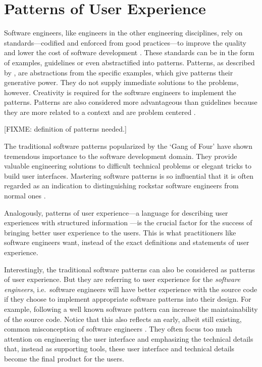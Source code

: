 \documentclass{acm_proc_article-sp}
\begin{document}
\citet{unix:raymond}


\section{Patterns of User Experience}
\label{sec:pux}
Software engineers, like engineers in the other engineering
disciplines, rely on standards---codified and enforced from good
practices---to improve the quality and lower the cost of software
development \citep{practice:ipenz}. These standards can be in the form
of examples, guidelines or even abstractified into patterns. Patterns,
as described by \citet{patterns:griffiths}, are abstractions from the
specific examples, which give patterns their generative power. They do
not supply immediate solutions to the problems, however. Creativity is
required for the software engineers to implement the
patterns. Patterns are also considered more advantageous than
guidelines because they are more related to a context and are problem
centered \citep{patterns:welie}.

[FIXME: definition of patterns needed.]

The traditional software patterns popularized by the `Gang of Four'
\citep{patterns:gamma} have shown tremendous importance to the
software development domain. They provide valuable engineering
solutions to difficult technical problems or elegant tricks to build
user interfaces. Mastering software patterns is so influential that it
is often regarded as an indication to distinguishing rockstar software
engineers from normal ones \citep{rockstar:iskold}.

Analogously, patterns of user experience---a language for describing
user experiences with structured information
\citep{pux:blackwell}---is the crucial factor for the success of
bringing better user experience to the users. This is what
practitioners like software engineers want, instead of the exact
definitions and statements of user experience.

Interestingly, the traditional software patterns can also be
considered as patterns of user experience. But they are referring to
user experience for the \textit{software engineers}, i.e.\ software
engineers will have better experience with the source code if they
choose to implement appropriate software patterns into their
design. For example, following a well known software pattern can
increase the maintainability of the source code. Notice that this also
reflects an early, albeit still existing, common misconception of
software engineers \citep{pux:blackwell}. They often focus too much
attention on engineering the user interface and emphasizing the
technical details that, instead as supporting tools, these user
interface and technical details become the final product for the
users.
\end{document}
